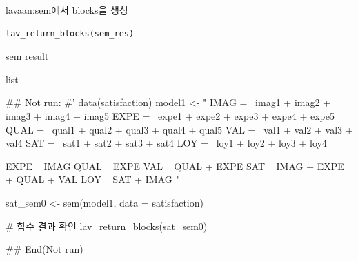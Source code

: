 \documentclass[a4paper]{book}
\begin{document}
%
\begin{Description}
lavaan:sem에서 blocks을 생성
\end{Description}
%
\begin{Usage}
\begin{verbatim}
lav_return_blocks(sem_res)
\end{verbatim}
\end{Usage}
%
\begin{Arguments}
\begin{ldescription}
\item[\code{sem\_res}] sem result
\end{ldescription}
\end{Arguments}
%
\begin{Value}
list
\end{Value}
%
\begin{Examples}
\begin{ExampleCode}

\#\# Not run: 
#'
data(satisfaction)
model1 <- "
IMAG =~ imag1 + imag2 + imag3 + imag4 + imag5
EXPE =~ expe1 + expe2 + expe3 + expe4 + expe5
QUAL =~ qual1 + qual2 + qual3 + qual4 + qual5
VAL =~ val1 + val2 + val3 + val4
SAT =~ sat1 + sat2 + sat3 + sat4
LOY =~ loy1 + loy2 + loy3 + loy4

EXPE ~ IMAG
QUAL ~ EXPE
VAL ~  QUAL + EXPE
SAT ~ IMAG + EXPE + QUAL + VAL
LOY ~ SAT + IMAG
"

sat_sem0 <- sem(model1, data = satisfaction)

# 함수 결과 확인
lav_return_blocks(sat_sem0)

## End(Not run)

\end{ExampleCode}
\end{Examples}
\end{document}
